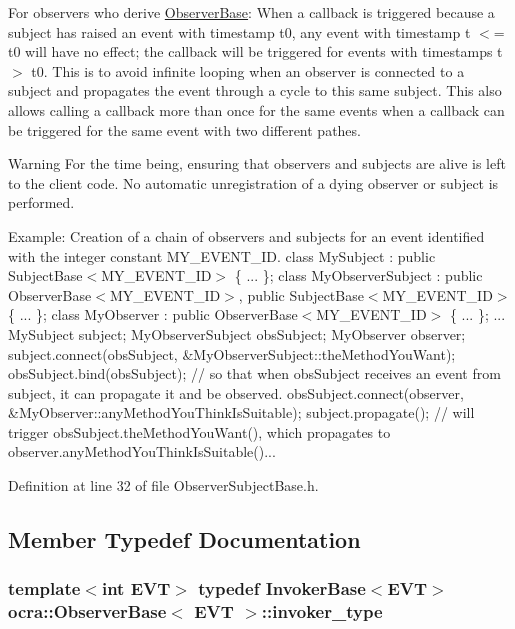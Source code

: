 For observers who derive \hyperlink{classocra_1_1ObserverBase}{Observer\+Base}\+: When a callback is triggered because a subject has raised an event with timestamp t0, any event with timestamp t $<$= t0 will have no effect; the callback will be triggered for events with timestamps t $>$ t0. This is to avoid infinite looping when an observer is connected to a subject and propagates the event through a cycle to this same subject. This also allows calling a callback more than once for the same events when a callback can be triggered for the same event with two different pathes.

\begin{DoxyWarning}{Warning}
For the time being, ensuring that observers and subjects are alive is left to the client code. No automatic unregistration of a dying observer or subject is performed.
\end{DoxyWarning}
Example\+:  Creation of a chain of observers and subjects for an event identified with the integer constant M\+Y\+\_\+\+E\+V\+E\+N\+T\+\_\+\+ID. class My\+Subject \+: public Subject\+Base$<$\+M\+Y\+\_\+\+E\+V\+E\+N\+T\+\_\+\+I\+D$>$ \{ ... \}; class My\+Observer\+Subject \+: public Observer\+Base$<$\+M\+Y\+\_\+\+E\+V\+E\+N\+T\+\_\+\+I\+D$>$, public Subject\+Base$<$\+M\+Y\+\_\+\+E\+V\+E\+N\+T\+\_\+\+I\+D$>$ \{ ... \}; class My\+Observer \+: public Observer\+Base$<$\+M\+Y\+\_\+\+E\+V\+E\+N\+T\+\_\+\+I\+D$>$ \{ ... \}; ... My\+Subject subject; My\+Observer\+Subject obs\+Subject; My\+Observer observer; subject.\+connect(obs\+Subject, \&\+My\+Observer\+Subject\+::the\+Method\+You\+Want); obs\+Subject.\+bind(obs\+Subject); // so that when obs\+Subject receives an event from subject, it can propagate it and be observed. obs\+Subject.\+connect(observer, \&\+My\+Observer\+::any\+Method\+You\+Think\+Is\+Suitable); subject.\+propagate(); // will trigger obs\+Subject.\+the\+Method\+You\+Want(), which propagates to observer.\+any\+Method\+You\+Think\+Is\+Suitable()...  

Definition at line 32 of file Observer\+Subject\+Base.\+h.



\subsection{Member Typedef Documentation}
\subsubsection[{\texorpdfstring{invoker\+\_\+type}{invoker_type}}]{\setlength{\rightskip}{0pt plus 5cm}template$<$int E\+VT$>$ typedef {\bf Invoker\+Base}$<$E\+VT$>$ {\bf ocra\+::\+Observer\+Base}$<$ E\+VT $>$\+::{\bf invoker\+\_\+type}\hspace{0.3cm}{\ttfamily [protected]}}\hypertarget{classocra_1_1ObserverBase_ad31fb33848323db6c887427f7dbf5c42}{}\label{classocra_1_1ObserverBase_ad31fb33848323db6c887427f7dbf5c42}



